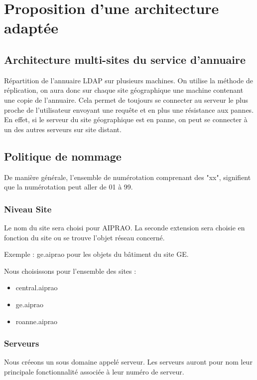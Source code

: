 \section{Proposition d'une architecture adaptée}

\subsection{Architecture multi-sites du service d'annuaire}

Répartition de l'annuaire LDAP sur plusieurs machines. On utilise la méthode de
réplication, on aura donc sur chaque site géographique une machine contenant 
une copie de l'annuaire. Cela permet de toujours se connecter au serveur le 
plus proche de l'utilisateur envoyant une requête et en plus une résistance 
aux pannes. En effet, si le serveur du site géographique est en panne, on peut
se connecter à un des autres serveurs sur site distant.

\subsection{Politique de nommage}

De manière générale, l'ensemble de numérotation comprenant des "xx", signifient 
que la numérotation peut aller de 01 à 99.

\subsubsection{Niveau Site}

Le nom du site sera choisi pour AIPRAO. La seconde extension sera choisie en fonction
du site ou se trouve l'objet réseau concerné. 

Exemple : ge.aiprao pour les objets du bâtiment du site GE. 

Nous choisissons pour l'ensemble des sites : 
\begin{itemize}
\item central.aiprao
\item ge.aiprao
\item roanne.aiprao
\end{itemize}

\subsubsection{Serveurs}

Nous créeons un sous domaine appelé serveur. Les serveurs auront pour nom leur 
principale fonctionnalité associée à leur numéro de serveur. 

